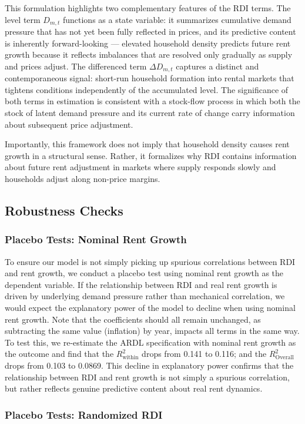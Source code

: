 \documentclass[pdflatex,sn-basic]{sn-jnl}%
\theoremstyle{thmstyleone}%
\theoremstyle{thmstyletwo}%
\theoremstyle{thmstylethree}%
\begin{document}
This formulation highlights two complementary features of the RDI terms. The 
level term $D_{m,t}$ functions as a state variable: it summarizes cumulative 
demand pressure that has not yet been fully reflected in prices, and its 
predictive content is inherently forward-looking --- elevated household density 
predicts future rent growth because it reflects imbalances that are resolved only 
gradually as supply and prices adjust. The differenced term $\Delta D_{m,t}$ 
captures a distinct and contemporaneous signal: short-run household formation 
into rental markets that tightens conditions independently of the accumulated 
level. The significance of both terms in estimation is consistent with a 
stock-flow process in which both the stock of latent demand pressure and its 
current rate of change carry information about subsequent price adjustment.

Importantly, this framework does not imply that household density causes rent 
growth in a structural sense. Rather, it formalizes why RDI contains information 
about future rent adjustment in markets where supply responds slowly and 
households adjust along non-price margins.
\subsection{Robustness Checks}

\subsubsection{Placebo Tests: Nominal Rent Growth}
To ensure our model is not simply picking up spurious correlations between RDI and rent growth, we conduct a placebo test using nominal rent growth as the dependent variable. If the relationship between RDI and real rent growth is driven by underlying demand pressure rather than mechanical correlation, we would expect the explanatory power of the model to decline when using nominal rent growth. Note that the coefficients should all remain unchanged, as subtracting the same value (inflation) by year, impacts all terms in the same way.  To test this, we re-estimate the ARDL specification with nominal rent growth as the outcome and find that the ${R}^2_\text{within}$ drops from 0.141 to 0.116; and the ${R}^2_\text{Overall}$ drops from 0.103 to 0.0869. This decline in explanatory power confirms that the relationship between RDI and rent growth is not simply a spurious correlation, but rather reflects genuine predictive content about real rent dynamics.
\subsubsection{Placebo Tests: Randomized RDI}
\end{document}
